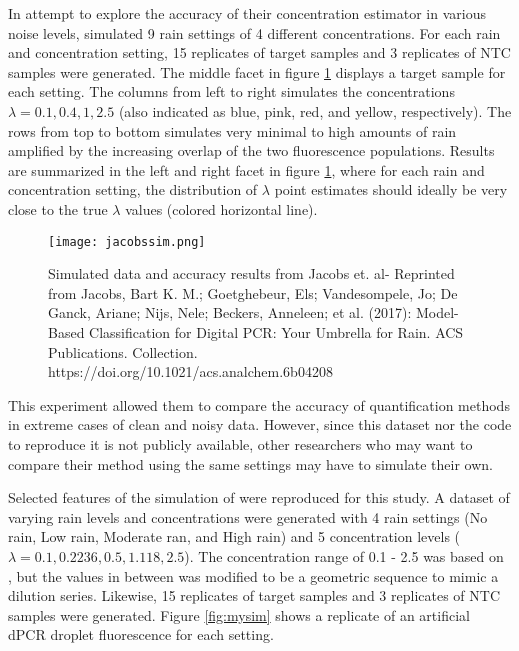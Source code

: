 In attempt to explore the accuracy of their concentration estimator in various noise levels,  simulated 9 rain settings of 4 different concentrations. For each rain and concentration setting, 15 replicates of target samples and 3 replicates of NTC samples were generated. The middle facet in figure \ref{fig:jacobssim} displays a target sample for each setting. The columns from left to right simulates the concentrations \(\lambda = 0.1, 0.4, 1, 2.5\) (also indicated as blue, pink, red, and yellow, respectively). The rows from top to bottom simulates very minimal to high amounts of rain amplified by the increasing overlap of the two fluorescence populations. Results are summarized in the left and right facet in figure \ref{fig:jacobssim}, where for each rain and concentration setting, the distribution of \(\lambda\) point estimates should ideally be very close to the true \(\lambda\) values (colored horizontal line).

\begin{figure}[h]
    \centering
    \texttt{[image: jacobssim.png]}
    \caption[Simulated data and accuracy results from Jacobs et. al]{Simulated data and accuracy results from Jacobs et. al- Reprinted from Jacobs, Bart K. M.; Goetghebeur, Els; Vandesompele, Jo; De Ganck, Ariane; Nijs, Nele; Beckers, Anneleen; et al. (2017): Model-Based Classification for Digital PCR: Your Umbrella for Rain. ACS Publications. Collection. https://doi.org/10.1021/acs.analchem.6b04208}
        \label{fig:jacobssim}
\end{figure}

This experiment allowed them to compare the accuracy of quantification methods in extreme cases of clean and noisy data. However, since this dataset nor the code to reproduce it is not publicly available, other researchers who may want to compare their method using the same settings may have to simulate their own.

Selected features of the simulation of  were reproduced for this study. A dataset of varying rain levels and concentrations were generated with 4 rain settings (No rain, Low rain, Moderate ran, and High rain) and 5 concentration levels (\(\lambda = 0.1, 0.2236, 0.5, 1.118, 2.5\)). The concentration range of 0.1 - 2.5  was based on , but the values in between was modified to be a geometric sequence to mimic a dilution series. Likewise, 15 replicates of target samples and 3 replicates of NTC samples were generated. Figure \ref{fig:mysim} shows a replicate of an artificial dPCR droplet fluorescence for each setting.

